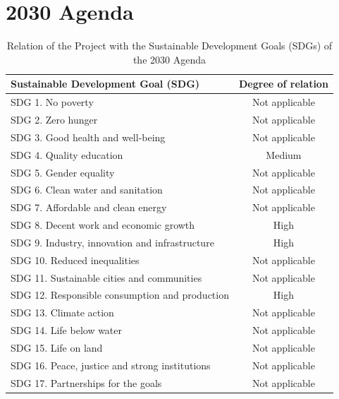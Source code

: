 \documentclass[11pt,english,a4paper,hidelinks]{book}
\begin{document}
\section{2030 Agenda}

\begin{table}[H]
    \centering
    \caption{Relation of the Project with the Sustainable Development Goals (SDGs) of the 2030 Agenda}
    \begin{tabular}{lc}
    \toprule
    \textbf{Sustainable Development Goal (SDG)} & \textbf{Degree of relation} \\
    \hline
    SDG 1. No poverty & Not applicable \\
    \hline
    SDG 2. Zero hunger & Not applicable \\
    \hline
    SDG 3. Good health and well-being & Not applicable \\
    \hline
    SDG 4. Quality education & Medium \\
    \hline
    SDG 5. Gender equality & Not applicable \\
    \hline
    SDG 6. Clean water and sanitation & Not applicable \\
    \hline
    SDG 7. Affordable and clean energy & Not applicable \\
    \hline
    SDG 8. Decent work and economic growth & High \\
    \hline
    SDG 9. Industry, innovation and infrastructure & High \\
    \hline
    SDG 10. Reduced inequalities & Not applicable \\
    \hline
    SDG 11. Sustainable cities and communities & Not applicable \\
    \hline
    SDG 12. Responsible consumption and production & High \\
    \hline
    SDG 13. Climate action & Not applicable \\
    \hline
    SDG 14. Life below water & Not applicable \\
    \hline
    SDG 15. Life on land & Not applicable \\
    \hline
    SDG 16. Peace, justice and strong institutions & Not applicable \\
    \hline
    SDG 17. Partnerships for the goals & Not applicable \\
    \bottomrule
    \end{tabular}
\end{table}
\end{document}
